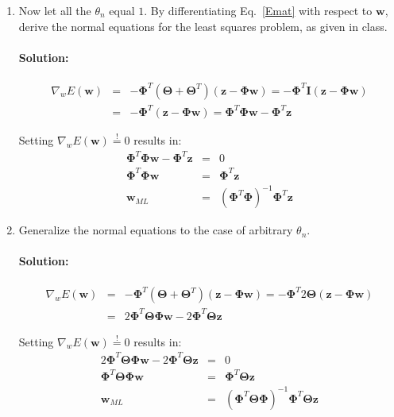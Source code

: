 \documentclass{article}
\renewcommand{\Vec}[1]{\ensuremath{\mathbf{#1}}}
\newcommand{\Mtx}[1]{\ensuremath{\mathbf{#1}}}
\begin{document}
\begin{enumerate}
\item Now let all the $\theta_n$ equal $1$. By differentiating Eq.\ \ref{Emat} 
with respect to \Vec{w}, derive the normal equations for the least squares problem, 
as given in class. 

\paragraph*{Solution:}
\begin{eqnarray}
\nabla_w E(\Vec{w}) &=& -\Mtx{\Phi}^T (\Mtx{\Theta} + \Mtx{\Theta}^T) (\Vec{z}-\Mtx{\Phi} \Vec{w}) = -\Mtx{\Phi}^T \Mtx{I} (\Vec{z}-\Mtx{\Phi} \Vec{w})\\
&=& -\Mtx{\Phi}^T (\Vec{z}-\Mtx{\Phi} \Vec{w}) = \Mtx{\Phi}^T \Mtx{\Phi} \Vec{w} - \Mtx{\Phi}^T \Vec{z}
\end{eqnarray}

Setting $\nabla_w E(\Vec{w}) \overset{!}{=} 0$ results in:
\begin{eqnarray}
\Mtx{\Phi}^T \Mtx{\Phi} \Vec{w} - \Mtx{\Phi}^T \Vec{z} &=& 0\\
\Mtx{\Phi}^T \Mtx{\Phi} \Vec{w} &=& \Mtx{\Phi}^T \Vec{z}\\
\Vec{w}_{ML} &=& (\Mtx{\Phi}^T \Mtx{\Phi})^{-1}\Mtx{\Phi}^T \Vec{z}
\end{eqnarray}


\item Generalize the normal equations to the case of arbitrary $\theta_n$.

\paragraph*{Solution:}
\begin{eqnarray}
\nabla_w E(\Vec{w}) &=& -\Mtx{\Phi}^T (\Mtx{\Theta} + \Mtx{\Theta}^T) (\Vec{z}-\Mtx{\Phi} \Vec{w}) = - \Mtx{\Phi}^T 2\Mtx{\Theta} (\Vec{z}-\Mtx{\Phi} \Vec{w})\\
&=& 2 \Mtx{\Phi}^T \Mtx{\Theta} \Mtx{\Phi} \Vec{w} - 2 \Mtx{\Phi}^T \Mtx{\Theta} \Vec{z}
\end{eqnarray}

Setting $\nabla_w E(\Vec{w}) \overset{!}{=} 0$ results in:
\begin{eqnarray}
2 \Mtx{\Phi}^T \Mtx{\Theta} \Mtx{\Phi} \Vec{w} - 2 \Mtx{\Phi}^T \Mtx{\Theta} \Vec{z} &=& 0\\
\Mtx{\Phi}^T \Mtx{\Theta} \Mtx{\Phi} \Vec{w} &=& \Mtx{\Phi}^T \Mtx{\Theta} \Vec{z}\\
\Vec{w}_{ML} &=& (\Mtx{\Phi}^T \Mtx{\Theta} \Mtx{\Phi})^{-1} \Mtx{\Phi}^T \Mtx{\Theta} \Vec{z}
\end{eqnarray}



\end{enumerate}
\end{document}
